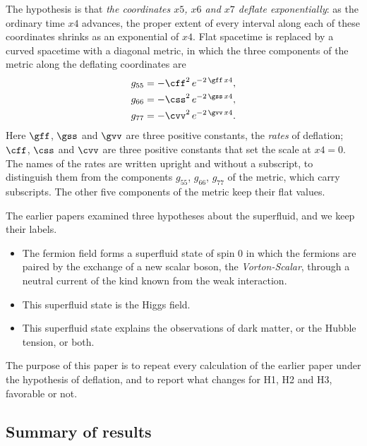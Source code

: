 The hypothesis is that \emph{the coordinates $x5$, $x6$ and $x7$ deflate exponentially}: as the
ordinary time $x4$ advances, the proper extent of every interval along each of these coordinates
shrinks as an exponential of $x4$. Flat spacetime is replaced by a curved spacetime with a diagonal
metric, in which the three components of the metric along the deflating coordinates are
\begin{equation}
\begin{aligned}
g_{55}&=-\cff^{2}\,e^{-2\,\gff\,x4},\\
g_{66}&=-\css^{2}\,e^{-2\,\gss\,x4},\\
g_{77}&=-\cvv^{2}\,e^{-2\,\gvv\,x4}.
\end{aligned}
\label{eq:hyp}
\end{equation}
Here $\gff$, $\gss$ and $\gvv$ are three positive constants, the \emph{rates} of deflation; $\cff$,
$\css$ and $\cvv$ are three positive constants that set the scale at $x4=0$. The names of the rates
are written upright and without a subscript, to distinguish them from the components $g_{55}$,
$g_{66}$, $g_{77}$ of the metric, which carry subscripts. The other five components of the metric
keep their flat values. 

The earlier papers examined three hypotheses about the superfluid, and we keep their labels.
\begin{itemize}
\item[H1.] The fermion field forms a superfluid state of spin 0 in which the fermions are paired by
the exchange of a new scalar boson, the \emph{Vorton-Scalar}, through a neutral current of the kind
known from the weak interaction.
\item[H2.] This superfluid state is the Higgs field.
\item[H3.] This superfluid state explains the observations of dark matter, or the Hubble tension, or
both.
\end{itemize}
The purpose of this paper is to repeat every calculation of the earlier paper under the hypothesis of
deflation, and to report what changes for H1, H2 and H3, favorable or not.

\subsection{Summary of results}


